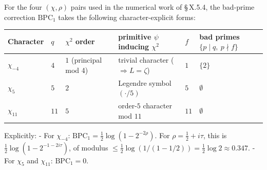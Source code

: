 For the four \((\chi, \rho)\) pairs used in the numerical work of \S\,X.5.4,
the bad-prime correction \(\mathrm{BPC}_1\) takes the following
character-explicit forms:

{\def\LTcaptype{none} %
\begin{longtable}[]{@{}
  >{\raggedright\arraybackslash}p{}
  >{\raggedleft\arraybackslash}p{}
  >{\centering\arraybackslash}p{}
  >{\raggedright\arraybackslash}p{}
  >{\raggedleft\arraybackslash}p{}
  >{\raggedright\arraybackslash}p{}@{}}
\toprule\noalign{}
\begin{minipage}[b]{\linewidth}\raggedright
Character
\end{minipage} & \begin{minipage}[b]{\linewidth}\raggedleft
\(q\)
\end{minipage} & \begin{minipage}[b]{\linewidth}\centering
\(\chi^2\) order
\end{minipage} & \begin{minipage}[b]{\linewidth}\raggedright
primitive \(\psi\) inducing \(\chi^2\)
\end{minipage} & \begin{minipage}[b]{\linewidth}\raggedleft
\(f\)
\end{minipage} & \begin{minipage}[b]{\linewidth}\raggedright
bad primes \(\{p \mid q,\ p \nmid f\}\)
\end{minipage} \\
\midrule\noalign{}
\endhead
\bottomrule\noalign{}
\endlastfoot
\(\chi_{-4}\) & \(4\) & \(1\) (principal mod 4) & trivial character (\(\Rightarrow L = \zeta\)) & \(1\) & \(\{2\}\) \\
\(\chi_5\) & \(5\) & \(2\) & Legendre symbol \((\cdot/5)\) & \(5\) & \(\emptyset\) \\
\(\chi_{11}\) & \(11\) & \(5\) & order-\(5\) character mod \(11\) & \(11\) & \(\emptyset\) \\
\end{longtable}
}

Explicitly:
- For \(\chi_{-4}\): \(\mathrm{BPC}_1 = \tfrac{1}{2}\log(1 - 2^{-2\rho})\).
For \(\rho = \tfrac12 + i\tau\), this is
\(\tfrac{1}{2}\log(1 - 2^{-1 - 2i\tau})\), of modulus
\(\le \tfrac{1}{2}\log(1/(1-1/2)) = \tfrac12 \log 2 \approx 0.347\).
- For \(\chi_5\) and \(\chi_{11}\): \(\mathrm{BPC}_1 = 0\).

